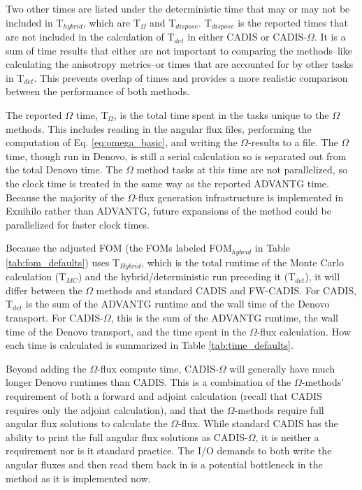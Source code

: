 Two other times are listed under the deterministic time that may or may not be
included in T$_{hybrid}$, which are T$_{\Omega}$ and T$_{dispose}$. T$_{dispose}$ is the
reported times that are not included in the calculation of T$_{det}$ in either
CADIS or CADIS-$\Omega$. It is a sum of time results that either are not
important to comparing the methods--like calculating the anisotropy metrics--or
times that are accounted for by other tasks in T$_{det}$. This prevents overlap
of times and provides a more realistic comparison between the performance of
both methods.

The reported $\Omega$ time, T$_{\Omega}$, is the total
time spent in the tasks unique to the $\Omega$ methods. This includes reading
in the angular flux files, performing the computation of Eq.
\eqref{eq:omega_basic}, and writing the $\Omega$-results to a file.
The $\Omega$ time,
though run in Denovo, is still a serial calculation so is separated out from the
total Denovo time. The $\Omega$ method tasks at this time are not
parallelized, so the clock time is treated in the same way as the reported
ADVANTG time. Because the majority of the $\Omega$-flux generation
infrastructure is implemented in Exnihilo rather than ADVANTG, future expansions
of the method could be parallelized for faster clock times.

Because the adjusted FOM (the FOMs labeled FOM$_{hybrid}$ in Table
\ref{tab:fom_defaults}) uses T$_{Hybrid}$, which is the total runtime of the
Monte Carlo calculation (T$_{MC}$) and the hybrid/deterministic run preceding it
(T$_{det}$), it will differ between
the $\Omega$ methods and standard CADIS and FW-CADIS. For CADIS, T$_{det}$ is
the sum of the ADVANTG runtime and the wall time of the Denovo transport. For
CADIS-$\Omega$, this is the sum of the ADVANTG runtime, the wall time of the
Denovo transport, and the time spent in the $\Omega$-flux calculation. How each
time is calculated is summarized in Table \ref{tab:time_defaults}.

Beyond
adding the $\Omega$-flux compute time, CADIS-$\Omega$ will generally have much
longer Denovo runtimes than CADIS. This is a combination of the $\Omega$-methods'
requirement of both a forward and adjoint calculation (recall that CADIS
requires only the adjoint calculation), and that the $\Omega$-methods require
full angular flux solutions to calculate the $\Omega$-flux. While standard CADIS
has the ability to print the full angular flux solutions as CADIS-$\Omega$, it
is neither a requirement nor is it standard practice. The I/O demands to both write
the angular fluxes and then read them back in is a potential bottleneck in the
method as it is implemented now.

